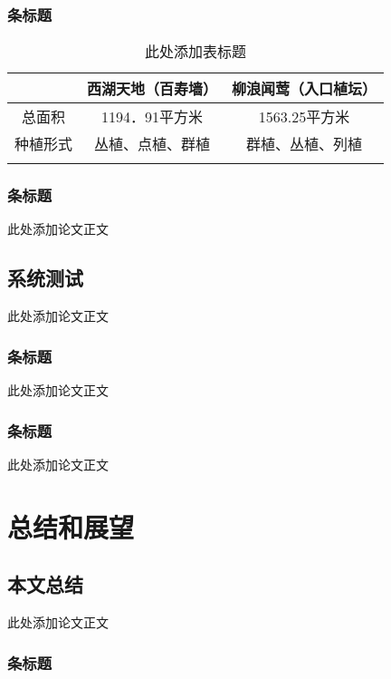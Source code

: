 \documentclass{article}
\begin{document}
\subsubsection{条标题}

\begin{table}[H]
\centering
\caption{此处添加表标题}\label{tab1-1}
\begin{tabular}{!{\vrule width1.2pt}c|c|c!{\vrule width1.2pt}}
\Xhline{1.2pt}
 & 西湖天地（百寿墙） & 柳浪闻莺（入口植坛）\\ \hline
总面积 & 1194．91平方米 & 1563.25平方米\\ \hline
种植形式 & 丛植、点植、群植  & 群植、丛植、列植\\ \Xhline{1.2pt}
\end{tabular}
\end{table}


\subsubsection{条标题}
此处添加论文正文

\subsection{系统测试}
此处添加论文正文

\subsubsection{条标题}
此处添加论文正文

\subsubsection{条标题}
此处添加论文正文

\section{总结和展望 }

\subsection{本文总结}
此处添加论文正文

\subsubsection{条标题}
\end{document}
